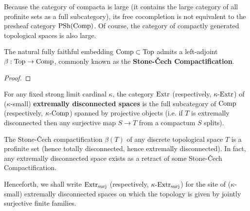             \begin{remark}
                Because the category of compacta is large (it contains the large category of all profinite sets as a full subcategory), its free cocompletion is not equivalent to the presheaf category $\mathrm{PSh}(\mathrm{Comp})$. Of course, the category of compactly generated topological spaces is also large. 
            \end{remark}
            \begin{lemma} \label{lemma: the_stone_cech_compactification}
                The natural fully faithful embedding $\mathrm{Comp} \subset \mathrm{Top}$ admits a left-adjoint $\beta: \mathrm{Top} \to \mathrm{Comp}$, commonly known as the \textbf{Stone-\v{C}ech Compactification}.
            \end{lemma}
                \begin{proof}
                    
                \end{proof}
            \begin{definition} \label{def: extremally_disconnected_spaces}
                For any fixed strong limit cardinal $\kappa$, the category $\mathrm{Extr}$ (respectively, $\kappa\text{-}\mathrm{Extr}$) of ($\kappa$-small) \textbf{extremally disconnected spaces} is the full subcategory of $\mathrm{Comp}$ (respectively, $\kappa\text{-}\mathrm{Comp}$) spanned by projective objects (i.e. if $T$ is extremally disconnected then any surjective map $S \to T$ from a compactum $S$ splits). 
            \end{definition}
            \begin{example} \label{example: stone_cech_compactifications_of_discrete_spaces}
                The Stone-\v{C}ech compactification $\beta(T)$ of any discrete topological space $T$ is a profinite set (hence totally disconnected, hence extremally disconnected). In fact, any extremally disconnected space exists as a retract of some Stone-\v{C}ech Compactification.
            \end{example}
            \begin{convention} \label{conv: the_site_of_extremally_disconnected_spaces}
                Henceforth, we shall write $\mathrm{Extr}_{\mathrm{surj}}$ (respectively, $\kappa\text{-}\mathrm{Extr}_{\mathrm{surj}}$) for the site of ($\kappa$-small) extremally disconnected spaces on which the topology is given by jointly surjective finite families.
            \end{convention}
